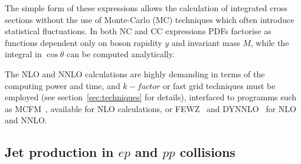 The simple form of these expressions allows the calculation of integrated
cross sections without the use of Monte-Carlo (MC) techniques which often 
introduce statistical fluctuations.
In both NC and CC expressions PDFs
factorise as functions dependent only on boson rapidity \(y\) and
invariant mass \(M\), while
the integral in \(\cos\theta\) can be computed analytically.

The NLO and NNLO calculations are 
highly demanding
in terms of the computing power and time, and $k-factor$ or fast grid techniques must be employed (see section~\ref{sec:techniques}
for details), interfaced to programms such as
MCFM~\cite{Campbell:1999ah,Campbell:2000je,Campbell:2010ff}, 
available for NLO calculations, or 
FEWZ~\cite{FEWZ} and DYNNLO~\cite{DYNNLO} for NLO and NNLO.
 






\subsection{Jet production in $ep$ and $pp$ collisions}
\label{jetsection}

